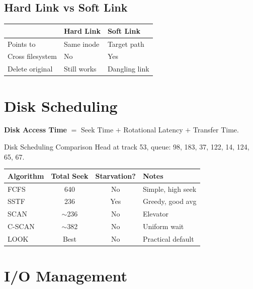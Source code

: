 \documentclass[12pt,a4paper]{article}
\begin{document}
\subsection{Hard Link vs Soft Link}
\begin{center}
\begin{tabular}{@{} l l l @{}}
\toprule
& \textbf{Hard Link} & \textbf{Soft Link} \\
\midrule
Points to & Same inode & Target path \\
Cross filesystem & No & Yes \\
Delete original & Still works & Dangling link \\
\bottomrule
\end{tabular}
\end{center}

\section{Disk Scheduling}

\textbf{Disk Access Time} $=$ Seek Time $+$ Rotational Latency $+$ Transfer Time.

\begin{examplebox}{Disk Scheduling Comparison}
Head at track 53, queue: 98, 183, 37, 122, 14, 124, 65, 67.

\begin{center}
\begin{tabular}{@{} l c c l @{}}
\toprule
\textbf{Algorithm} & \textbf{Total Seek} & \textbf{Starvation?} & \textbf{Notes} \\
\midrule
FCFS & 640 & No & Simple, high seek \\
SSTF & 236 & Yes & Greedy, good avg \\
SCAN & $\sim$236 & No & Elevator \\
C-SCAN & $\sim$382 & No & Uniform wait \\
LOOK & Best & No & Practical default \\
\bottomrule
\end{tabular}
\end{center}
\end{examplebox}

\section{I/O Management}
\end{document}
